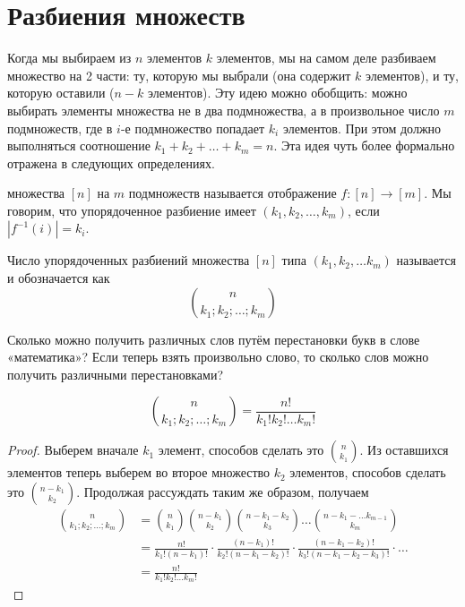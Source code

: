 \section{Разбиения множеств}

Когда мы выбираем из $n$ элементов $k$ элементов, мы на самом деле разбиваем множество на 2 части: ту, которую мы выбрали (она содержит $k$ элементов), и ту, которую оставили ($n-k$ элементов). Эту идею можно обобщить: можно выбирать элементы множества не в два подмножества, а в произвольное число $m$ подмножеств, где в $i$-е подмножество попадает $k_i$ элементов. При этом должно выполняться соотношение $k_1+k_2+\ldots+k_m = n$. Эта идея чуть более формально отражена в следующих определениях.

\begin{definition}
 множества $[n]$ на $m$ подмножеств называется отображение $f:[n]\to[m]$. Мы говорим, что упорядоченное разбиение имеет  $(k_1, k_2, \ldots, k_m)$, если $|f^{-1}(i)| = k_i$.
\end{definition}

\begin{definition}
Число упорядоченных разбиений множества $[n]$ типа $(k_1, k_2, \ldots k_m)$ называется  и обозначается как
$$n \choose k_1; k_2;\ldots; k_m$$
\end{definition}

\begin{exercise}
Сколько можно получить различных слов путём перестановки букв в слове «математика»? Если теперь взять произвольно слово, то сколько слов можно получить различными перестановками?
\end{exercise}

\begin{thm}
$${n \choose k_1; k_2;\ldots; k_m} = \frac{n!}{k_1!k_2!\ldots k_m!}$$
\end{thm}
\begin{proof}
Выберем вначале $k_1$ элемент, способов сделать это $n\choose k_1$. Из оставшихся элементов теперь выберем во второе множество $k_2$ элементов, способов сделать это $n-k_1\choose k_2$. Продолжая рассуждать таким же образом, получаем
\begin{align*}
{n \choose k_1; k_2;\ldots; k_m} & = {n\choose k_1}{n-k_1\choose k_2}{n-k_1-k_2\choose k_3}\ldots{n-k_1-\ldots k_{m-1}\choose k_m} \\
&= \frac{n!}{k_1!(n-k_1)!}\cdot\frac{(n-k_1)!}{k_2!(n-k_1-k_2)!}\cdot\frac{(n-k_1-k_2)!}{k_3!(n-k_1-k_2-k_3)!}\cdot\ldots\\
&=\frac{n!}{k_1!k_2!\ldots k_m!}
\end{align*}
\end{proof}

